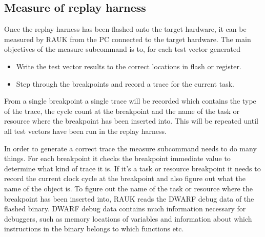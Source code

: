 \subsection{Measure of replay harness}
Once the replay harness has been flashed onto the target hardware, it can
be measured by RAUK from the PC connected to the target hardware. The main
objectives of the measure subcommand is to, for each test vector generated
\begin{itemize}
   \item Write the test vector results to the correct locations in flash or register.
   \item Step through the breakpoints and record a trace for the current task.
\end{itemize}
From a single breakpoint a single trace will be recorded which contains the
type of the trace, the cycle count at the breakpoint and the name of the task
or resource where the breakpoint has been inserted into. This will be repeated
until all test vectors have been run in the replay harness.

In order to generate a correct trace the measure subcommand needs to do many
things. For each breakpoint it checks the breakpoint immediate value to
determine what kind of trace it is. If it's a task or resource breakpoint it
needs to record the current clock cycle at the breakpoint and also figure out
what the name of the object is. To figure out the name of the task or resource
where the breakpoint has been inserted into, RAUK reads the
DWARF\cite{dwarfspec} debug data of the flashed binary. DWARF debug data
contains much information necessary for debuggers, such as memory locations of
variables and information about which instructions in the binary belongs to
which functions etc.

